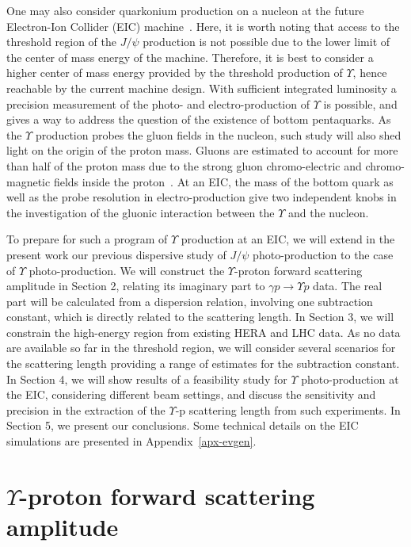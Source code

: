\documentclass[prd,amsmath,%
twocolumn,floatfix,amssymb, preprintnumbers, linenumbers,nofootinbib, superscriptaddress]{revtex4}
\begin{document}
One may also consider quarkonium production on a nucleon at the future Electron-Ion Collider (EIC) 
machine~\cite{Accardi:2012qut}. Here, it is worth noting that access to the threshold region of the $J/\psi$ production is not possible due to the lower limit of the center of mass energy of the machine. Therefore, it is best to consider a higher center of mass energy provided by the threshold production of $\Upsilon$, hence reachable by the current machine design. With sufficient integrated luminosity a precision measurement of the photo- and electro-production of $\Upsilon$ is possible, and gives a way to address the question of the existence of bottom pentaquarks. As the $\Upsilon$ production probes the gluon fields in the nucleon, such study will also shed light on the origin of the proton mass. Gluons are estimated to account for more than half of the proton mass due to the strong gluon chromo-electric and chromo-magnetic fields inside the proton~\cite{Ji:1994av}. 
At an EIC, the mass of the bottom quark as well as  the probe resolution in electro-production give two independent knobs in the investigation of the gluonic interaction between the $\Upsilon$ and the nucleon.  

To prepare for such a program of $\Upsilon$ production at an EIC, we will extend in the present work our previous dispersive study of $J/\psi$ photo-production to the case of $\Upsilon$ photo-production. We will construct the $\Upsilon$-proton forward scattering amplitude in Section 2, relating  
its imaginary part to $\gamma p \to \Upsilon p$ data. The real part will be calculated from a dispersion relation, involving one subtraction constant, which is directly related to the scattering length. 
In Section 3, we will constrain the high-energy region from existing HERA and LHC data. As no data are available so far in the threshold region, we will consider several scenarios for the scattering length providing a range of estimates for the subtraction constant. 
In Section 4, we will show results of a feasibility study for $\Upsilon$ photo-production at the EIC, considering different beam settings, and discuss the sensitivity and precision in the extraction of the 
$\Upsilon$-p scattering length from such experiments. 
In Section 5, we present our conclusions. Some technical details on the EIC simulations are presented in Appendix~\ref{apx-evgen}. 

\section{$\Upsilon$-proton forward scattering amplitude}
\end{document}
